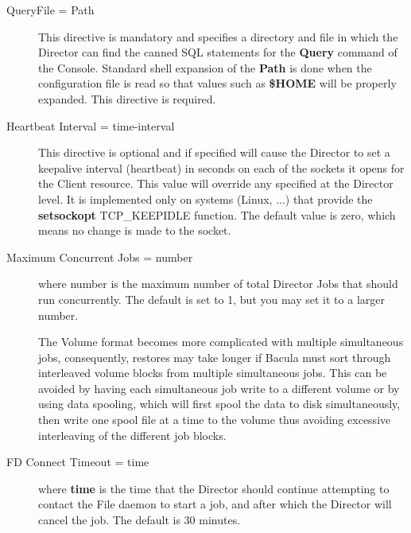 \begin{description}
\item [QueryFile = \lt{}Path\gt{}]
   This directive is mandatory and specifies a directory and file in which
   the Director can find the canned SQL statements for the {\bf Query}
   command of the Console.  Standard shell expansion of the {\bf Path} is
   done when the configuration file is read so that values such as {\bf
   \$HOME} will be properly expanded.  This directive is required.

\item [Heartbeat Interval = \lt{}time-interval\gt{}]
   This directive is optional and if specified will cause the Director to
   set a keepalive interval (heartbeat) in seconds on each of the sockets
   it opens for the Client resource.  This value will override any
   specified at the Director level.  It is implemented only on systems
   (Linux, ...) that provide the {\bf setsockopt} TCP\_KEEPIDLE function.
   The default value is zero, which means no change is made to the socket.


\label{DirMaxConJobs}
\item [Maximum Concurrent Jobs = \lt{}number\gt{}]
   where \lt{}number\gt{}  is the maximum number of total Director Jobs that
   should run  concurrently. The default is set to 1, but you may set it to a 
   larger number.  

   The Volume format becomes more complicated with 
   multiple simultaneous jobs, consequently, restores may take longer if
   Bacula must sort through interleaved volume blocks from  multiple simultaneous
   jobs. This can be avoided by having each simultaneous job write to
   a different volume or  by using data spooling, which will first spool the data
   to disk simultaneously, then write one spool file at a time to the volume
   thus avoiding excessive interleaving of the different job blocks.

\item [FD Connect Timeout = \lt{}time\gt{}]
   where {\bf time} is the time that the Director should continue
   attempting to contact the File daemon to start a job, and after which
   the Director will cancel the job.  The default is 30 minutes.


\end{description}
